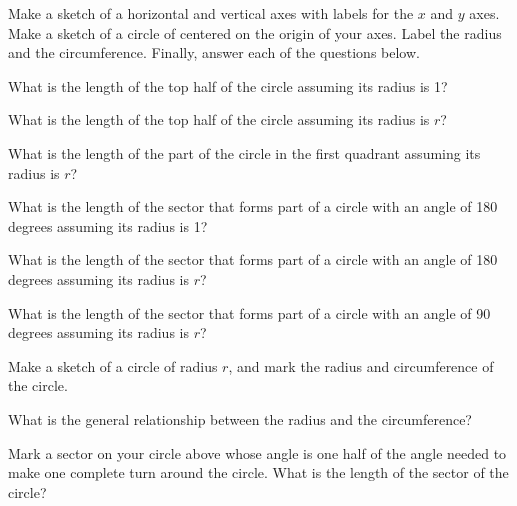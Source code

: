 \begin{problem}
\item Make a sketch of a horizontal and vertical axes with labels for
  the $x$ and $y$ axes. Make a sketch of a circle of centered on the
  origin of your axes. Label the radius and the
  circumference. Finally, answer each of the questions below.

  \vfill

  \begin{subproblem}
    \item What is the length of the top half of the circle assuming
      its radius is 1?
      \vspace{3em}
    \item What is the length of the top half of the circle assuming
      its radius is $r$?
      \vspace{3em}
    \item What is the length of the part of the circle in the first
      quadrant assuming its radius is $r$?  
      \vspace{3em}

    \item What is the length of the sector that forms part of a circle
      with an angle of 180 degrees assuming its radius is 1?  
      \vspace{3em}
    \item What is the length of the sector that forms part of a circle
      with an angle of 180 degrees assuming its radius is $r$?  
      \vspace{3em}
    \item What is the length of the sector that forms part of a circle
      with an angle of 90 degrees assuming its radius is $r$?  
      \vspace{3em}

  \end{subproblem}

  \clearpage

\item Make a sketch of a circle of radius $r$, and mark the radius and
  circumference of the circle.
  \vfill

  \begin{subproblem}
  \item What is the general relationship between the radius and the
    circumference? 
    \vspace{4em}

  \item Mark a sector on your circle above whose angle is one half of
    the angle needed to make one complete turn around the circle. What
    is the length of the sector of the circle?  



\end{subproblem}
\end{problem}

